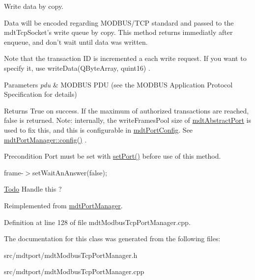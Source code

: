 Write data by copy. 

Data will be encoded regarding MODBUS/TCP standard and passed to the mdtTcpSocket's write queue by copy. This method returns immediatly after enqueue, and don't wait until data was written.

Note that the transaction ID is incremented a each write request. If you want to specify it, use writeData(QByteArray, quint16) .


\begin{DoxyParams}{Parameters}
{\em pdu} & MODBUS PDU (see the MODBUS Application Protocol Specification for details) \\
\hline
\end{DoxyParams}
\begin{DoxyReturn}{Returns}
True on success. If the maximum of authorized transactions are reached, false is returned. Note: internally, the writeFramesPool size of \hyperlink{classmdt_abstract_port}{mdtAbstractPort} is used to fix this, and this is configurable in \hyperlink{classmdt_port_config}{mdtPortConfig}. See \hyperlink{classmdt_port_manager_a9cf3ea2da38f81682695b37448712ffd}{mdtPortManager::config()} . 
\end{DoxyReturn}
\begin{DoxyPrecond}{Precondition}
Port must be set with \hyperlink{classmdt_port_manager_afcd156b2d0c9d340999935efb6cd8cb6}{setPort()} before use of this method. 
\end{DoxyPrecond}


frame-\/$>$setWaitAnAnswer(false);

\begin{Desc}
\item[\hyperlink{todo__todo000011}{Todo}]Handle this ? \end{Desc}




Reimplemented from \hyperlink{classmdt_port_manager_a6d3cc4e522326e2a6ca0da401ae58271}{mdtPortManager}.



Definition at line 128 of file mdtModbusTcpPortManager.cpp.



The documentation for this class was generated from the following files:\begin{DoxyCompactItemize}
\item 
src/mdtport/mdtModbusTcpPortManager.h\item 
src/mdtport/mdtModbusTcpPortManager.cpp\end{DoxyCompactItemize}
